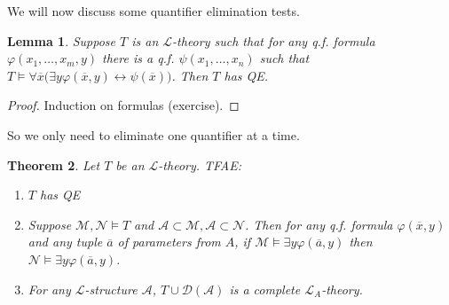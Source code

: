 \documentclass[]{article}
\theoremstyle{custhm}
\newtheorem{theorem}{Theorem}[section]
\theoremstyle{cusdef}
\theoremstyle{custhm}
\newtheorem{lemma}[theorem]{Lemma}
\theoremstyle{custhm}
\theoremstyle{custhm}
\theoremstyle{ex}
\theoremstyle{custhm}
\theoremstyle{cusdef}
\theoremstyle{remark}
\renewcommand{\L}{\mathcal{L}}
\newcommand{\M}{\mathcal{M}}
\renewcommand{\phi}{\varphi}
\renewcommand{\bar}{\overline}
\newcommand{\N}{\mathcal{N}}
\newcommand{\A}{\mathcal{A}}
\begin{document}
We will now discuss some quantifier elimination tests.

\begin{lemma}
Suppose $T$ is an $\L$-theory such that for any q.f. formula $\phi(x_1,\dots,x_m,y)$ there is a q.f. $\psi(x_1,\dots,x_n)$ such that $T\models \forall \bar{x}\big(\exists y \phi(\bar{x},y)\leftrightarrow \psi(\bar{x})\big)$. Then $T$ has QE.
\end{lemma}
\begin{proof}
Induction on formulas (exercise).
\end{proof}

So we only need to eliminate one quantifier at a time.

\begin{theorem}
Let $T$ be an $\L$-theory. TFAE:
\begin{enumerate}[label=\roman*)]
	\item $T$ has QE
	\item Suppose $\M,\N\models T$ and $\A\subset\M,\A\subset\N$. Then for any q.f. formula $\phi(\bar{x},y)$ and any tuple $\bar{a}$ of parameters from $A$, if $\M\models \exists y\phi(\bar{a},y)$ then $\N\models \exists y \phi(\bar{a},y)$.
	\item For any $\L$-structure $\A$, $T\cup \mathcal{D}(\A)$ is a complete $\L_A$-theory.
\end{enumerate}
\end{theorem}
\end{document}
